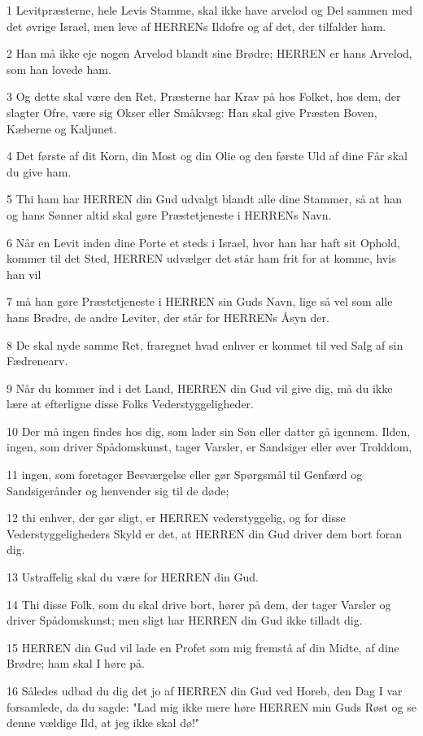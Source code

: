 \par 1 Levitpræsterne, hele Levis Stamme, skal ikke have arvelod og Del sammen med det øvrige Israel, men leve af HERRENs Ildofre og af det, der tilfalder ham.
\par 2 Han må ikke eje nogen Arvelod blandt sine Brødre; HERREN er hans Arvelod, som han lovede ham.
\par 3 Og dette skal være den Ret, Præsterne har Krav på hos Folket, hos dem, der slagter Ofre, være sig Okser eller Småkvæg: Han skal give Præsten Boven, Kæberne og Kaljunet.
\par 4 Det første af dit Korn, din Most og din Olie og den første Uld af dine Får skal du give ham.
\par 5 Thi ham har HERREN din Gud udvalgt blandt alle dine Stammer, så at han og hans Sønner altid skal gøre Præstetjeneste i HERRENs Navn.
\par 6 Når en Levit inden dine Porte et steds i Israel, hvor han har haft sit Ophold, kommer til det Sted, HERREN udvælger det står ham frit for at komme, hvis han vil
\par 7 må han gøre Præstetjeneste i HERREN sin Guds Navn, lige så vel som alle hans Brødre, de andre Leviter, der står for HERRENs Åsyn der.
\par 8 De skal nyde samme Ret, fraregnet hvad enhver er kommet til ved Salg af sin Fædrenearv.
\par 9 Når du kommer ind i det Land, HERREN din Gud vil give dig, må du ikke lære at efterligne disse Folks Vederstyggeligheder.
\par 10 Der må ingen findes hos dig, som lader sin Søn eller datter gå igennem. Ilden, ingen, som driver Spådomskunst, tager Varsler, er Sandsiger eller øver Trolddom,
\par 11 ingen, som foretager Besværgelse eller gør Spørgsmål til Genfærd og Sandsigerånder og henvender sig til de døde;
\par 12 thi enhver, der gør sligt, er HERREN vederstyggelig, og for disse Vederstyggeligheders Skyld er det, at HERREN din Gud driver dem bort foran dig.
\par 13 Ustraffelig skal du være for HERREN din Gud.
\par 14 Thi disse Folk, som du skal drive bort, hører på dem, der tager Varsler og driver Spådomskunst; men sligt har HERREN din Gud ikke tilladt dig.
\par 15 HERREN din Gud vil lade en Profet som mig fremstå af din Midte, af dine Brødre; ham skal I høre på.
\par 16 Således udbad du dig det jo af HERREN din Gud ved Horeb, den Dag I var forsamlede, da du sagde: "Lad mig ikke mere høre HERREN min Guds Røst og se denne vældige Ild, at jeg ikke skal dø!"
